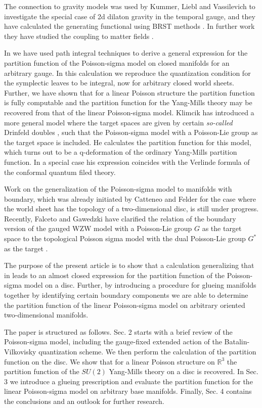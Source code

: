 \documentclass[a4paper,twoside,11pt]{article}
\numberwithin{equation}{section}
\begin{document}
The connection to gravity models was used by Kummer, Liebl and Vassilevich  to investigate the special case of 2d dilaton gravity in 
the temporal gauge, and they 
have calculated the generating functional using BRST methods \cite{KLV1}. In further work they have studied the coupling to matter 
fields \cite{KLV2}. 

In \cite{HS} we have used path integral techniques to derive a general expression for the partition function of the Poisson-sigma model 
on closed manifolds for an arbitrary gauge.  In this calculation we reproduce the quantization condition for the symplectic leaves to 
be integral, now for arbitrary closed world sheets. Further, we have shown that for a linear Poisson structure the partition function is 
fully computable and 
the partition function for the Yang-Mills theory may be recovered from that of the linear Poisson-sigma model. 
Klimcik \cite{KC} has introduced a more general model where the target spaces are given by certain  {\it so-called} Drinfeld doubles \cite{D}, 
such that the Poisson-sigma model with a Poisson-Lie group as the target space is included. He calculates the partition function for this model, which turns out to be 
a q-deformation of the ordinary Yang-Mills partition function. In a special case his expression coincides with the Verlinde formula of the conformal quantum filed theory.

Work on the generalization of the Poisson-sigma model to manifolds with boundary, which was already 
initiated by Catteneo and Felder for the case where the world sheet has the topology of a 
two-dimensional disc, is still under progress. Recently, Falceto and Gawedzki have clarified the relation of the boundary version of the gauged WZW model with a 
Poisson-Lie group $G$ as the target space to the topological Poisson sigma model with the dual Poisson-Lie group $G^*$ as the target \cite{GF}.
 
The purpose of the present article is to show that a calculation generalizing that in \cite{HS} leads to an almost closed expression for 
the partition function of the 
Poisson-sigma model on a disc.  Further, by introducing a procedure for glueing manifolds together by identifying certain boundary components 
we are able to determine the partition function of the linear Poisson-sigma model on arbitrary oriented two-dimensional manifolds. 

The paper is structured as follows. Sec. 2 starts with  a brief review of the Poisson-sigma model, 
including the gauge-fixed extended action of the Batalin-Vilkovisky quantization scheme.  We then perform the calculation 
of the partition function on the disc. We show that for a linear Poisson structure on $\mathds{R}^3$ 
 the partition function of the $SU(2)$ Yang-Mills theory on a disc is recovered. In Sec. 3 we introduce a glueing prescription 
and evaluate the partition function for the linear Poisson-sigma model on arbitrary base manifolds. 
Finally, Sec. 4 contains the conclusions and an outlook for further research.
%
%
%
\end{document}
